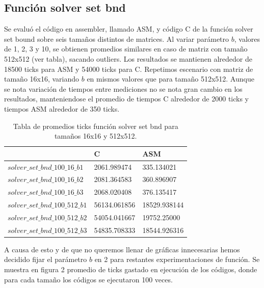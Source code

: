  

 
\subsection{Función solver set bnd}
 
Se evaluó el código en assembler, llamado ASM, y código C de la función solver set bound sobre seis tamaños distintos de matrices. Al variar parámetro $b$, valores de 1, 2, 3 y 10, se obtienen promedios similares en caso de matriz con tamaño 512x512 (ver tabla), sacando outliers. Los resultados se mantienen alrededor de 18500 ticks para ASM y 54000 ticks para C. 
Repetimos escenario con matriz de tamaño 16x16, variando $b$ en mismos valores que para tamaño 512x512. Aunque se nota 
variación de tiempos entre mediciones no se nota gran cambio en los resultados, manteniendose el promedio de tiempos C alrededor de 2000 ticks y tiempos ASM alrededor de 350 ticks.\newline
\begin{table}[htbp]
\begin{center}
\begin{tabular}{|l|l|l|}
\hline
  & C & ASM\\
\hline \hline
$solver\_set\_bnd\_100\_16\_b1$ & 2061.989474 & 335.134021\\ \hline
$solver\_set\_bnd\_100\_16\_b2$  & 2081.364583 & 360.896907\\ \hline
$solver\_set\_bnd\_100\_16\_b3$  & 2068.020408 & 376.135417 \\ 
\hline \hline
$solver\_set\_bnd\_100\_512\_b1$  & 56134.061856 & 18529.938144 \\ \hline

$solver\_set\_bnd\_100\_512\_b2$  & 54054.041667 & 19752.25000 \\ \hline

$solver\_set\_bnd\_100\_512\_b3$  &  54835.708333 & 18544.926316 \\ \hline

\end{tabular}
\caption{Tabla de promedios ticks función solver set bnd para tamaños 16x16 y 512x512.}
\end{center}
\end{table}
A causa de esto y de que no queremos llenar de gráficas innecesarias hemos decidido fijar el parámetro $b$ en 2 para restantes experimentaciones de función. 
Se muestra en figura 2 promedio de ticks gastado en ejecución de los códigos, donde para cada tamaño los códigos se ejecutaron 100 veces.
